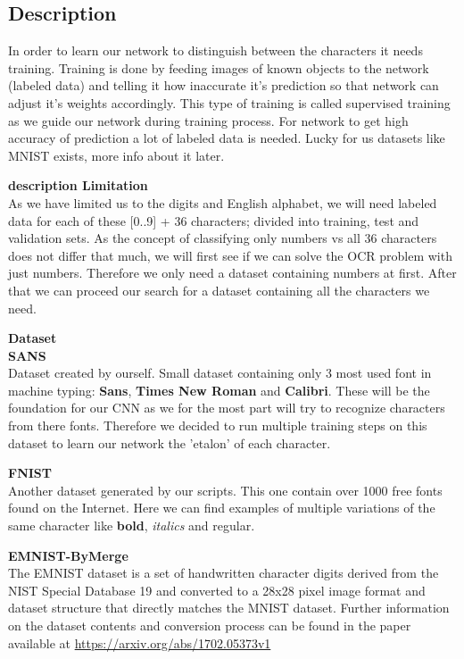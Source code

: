 \documentclass[Report.tex]{subfiles}
\begin{document}
\subsection{Description}

\begin{flushleft}
  In order to learn our network to distinguish between the characters it needs training. Training is done by feeding images of known objects to the network (labeled data) and telling it how inaccurate it's prediction so that network can adjust it's weights accordingly. This type of training is called supervised training as we guide our network during training process.
  For network to get high accuracy of prediction a lot of labeled data is needed. Lucky for us datasets like MNIST exists, more info about it later.
\end{flushleft}

\textbf{description Limitation} \\
As we have limited us to the digits and English alphabet, we will need labeled data for each of these [0..9] + 36 characters; divided into training, test and validation sets. As the concept of classifying only numbers vs all 36 characters does not differ that much, we will first see if we can solve the OCR problem with just numbers. Therefore we only need a dataset containing numbers at first. After that we can proceed our search for a dataset containing all the characters we need. \\

\begin{flushleft}
  \textbf{Dataset} \\
  \textbf{SANS} \\
  Dataset created by ourself.
  Small dataset containing only 3 most used font in machine typing:
  \textbf{Sans}, \textbf{Times New Roman} and \textbf{Calibri}. These will be the foundation for our CNN as we for the most part will try to recognize characters from there fonts. Therefore we decided to run multiple training steps on this dataset to learn our network the 'etalon' of each character.

  \textbf{FNIST} \\
  Another dataset generated by our scripts. This one contain over 1000 free fonts found on the Internet. Here we can find examples of multiple variations of the  same character like \textbf{bold}, \textit{italics} and regular.

  \textbf{EMNIST-ByMerge} \\
  The EMNIST dataset is a set of handwritten character digits derived from the NIST Special Database 19  and converted to a 28x28 pixel image format and dataset structure that directly matches the MNIST dataset. Further information on the dataset contents and conversion process can be found in the paper available at \href{https://arxiv.org/abs/1702.05373v1}{https://arxiv.org/abs/1702.05373v1}

\end{flushleft}
\end{document}
